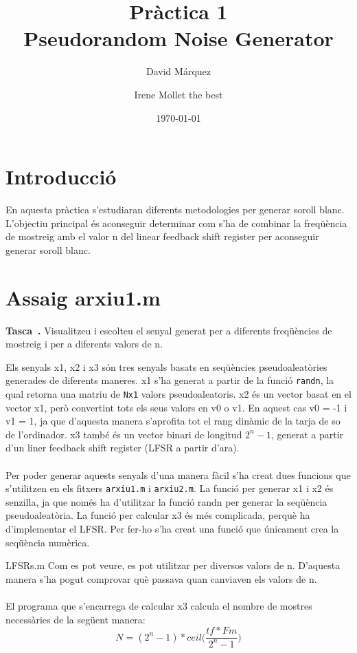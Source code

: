 \documentclass[11pt]{report}
\author{David Márquez\and Irene Mollet the best}
\date{\today}
\title{Pràctica 1\\Pseudorandom Noise Generator}
\newcounter{previCounter}
\newenvironment{enunciat}{
  \stepcounter{previCounter}
  \par\vspace{\baselineskip}\noindent
  {\bf Tasca~\thepreviCounter.}}{\par\medskip\ignorespacesafterend}
\begin{document}
\maketitle

\section*{Introducció}
En aquesta pràctica s'estudiaran diferents metodologies per generar soroll blanc. L'objectiu principal és aconseguir determinar com s'ha de combinar la freqüència de mostreig amb el valor n del linear feedback shift register per aconseguir generar soroll blanc.


\newpage
\section*{Assaig arxiu1.m}
\begin{enunciat}
     Visualitzeu i escolteu el senyal generat per a diferents freqüències de mostreig i per a diferents valors de n.
\end{enunciat}
Els senyals x1, x2 i x3 són tres senyals basats en seqüències pseudoaleatòries generades de diferents maneres.
x1 s'ha generat a partir de la funció \texttt{randn}, la qual retorna una matriu de \texttt{Nx1} valors pseudoaleatoris.
x2 és un vector basat en el vector x1, però convertint tots els seus valors en v0 o v1. En aquest cas v0 = -1 i v1 = 1, ja que d'aquesta manera s'aprofita tot el rang dinàmic de la tarja de so de l'ordinador.
x3 també és un vector binari de longitud ${2^n-1}$, generat a partir d'un liner feedback shift register (LFSR a partir d'ara).
\paragraph{}
Per poder generar aquests senyals d'una manera fàcil s'ha creat dues funcions que s'utilitzen en els fitxers \texttt{arxiu1.m} i \texttt{arxiu2.m}.
La funció per generar x1 i x2 és senzilla, ja que només ha d'utilitzar la funció randn per generar la seqüència pseudoaleatòria.
La funció per calcular x3 és més complicada, perquè ha d'implementar el LFSR. Per fer-ho s'ha creat una funció que únicament crea la seqüència numèrica.

 {LFSRs.m}
Com es pot veure, es pot utilitzar per diversos valors de n. D'aquesta manera s'ha pogut comprovar què passava quan canviaven els valors de n.
\paragraph{}
El programa que s'encarrega de calcular x3 calcula el nombre de mostres necessàries de la següent manera:
\begin{equation}
     N = (2^{n} - 1) * ceil\Big(\frac{tf * Fm}{2^{n} - 1}\Big)
\end{equation}
\end{document}
